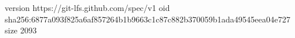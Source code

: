 version https://git-lfs.github.com/spec/v1
oid sha256:6877a093f825a6af857264b1b9663c1c87c882b370059b1ada49545eea04e727
size 2093
